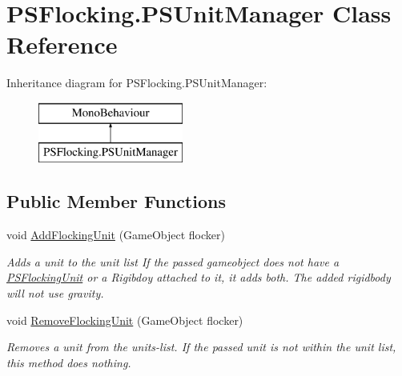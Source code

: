 \hypertarget{class_p_s_flocking_1_1_p_s_unit_manager}{}\section{P\+S\+Flocking.\+P\+S\+Unit\+Manager Class Reference}
\label{class_p_s_flocking_1_1_p_s_unit_manager}
Inheritance diagram for P\+S\+Flocking.\+P\+S\+Unit\+Manager\+:\begin{figure}[H]
\begin{center}
\leavevmode
\includegraphics[height=2.000000cm]{class_p_s_flocking_1_1_p_s_unit_manager}
\end{center}
\end{figure}
\subsection*{Public Member Functions}
\begin{DoxyCompactItemize}
\item 
void \hyperlink{class_p_s_flocking_1_1_p_s_unit_manager_a7781ba028d37cfe03fd3c540869751aa}{Add\+Flocking\+Unit} (Game\+Object flocker)
\begin{DoxyCompactList}\small\item\em Adds a unit to the unit list If the passed gameobject does not have a \hyperlink{class_p_s_flocking_1_1_p_s_flocking_unit}{P\+S\+Flocking\+Unit} or a Rigibdoy attached to it, it adds both. The added rigidbody will not use gravity. \end{DoxyCompactList}\item 
void \hyperlink{class_p_s_flocking_1_1_p_s_unit_manager_af7ec7299b52dc9206629f92dcfb601d2}{Remove\+Flocking\+Unit} (Game\+Object flocker)
\begin{DoxyCompactList}\small\item\em Removes a unit from the units-\/list. If the passed unit is not within the unit list, this method does nothing. \end{DoxyCompactList}\end{DoxyCompactItemize}
